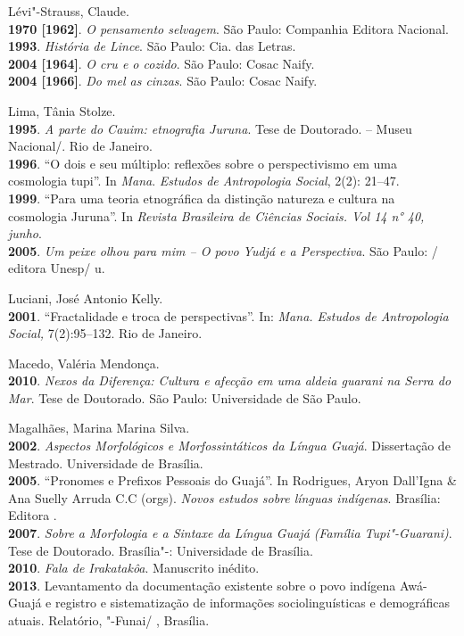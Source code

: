 \begin{Parskip}
Lévi"-Strauss, Claude.\\
\textbf{1970 {[}1962{]}}. \emph{O pensamento selvagem}. São Paulo:
Companhia Editora Nacional.\\
\textbf{1993}. \emph{História de Lince}. São Paulo: Cia. das Letras.\\
\textbf{2004 {[}1964{]}}. \emph{O cru e o cozido}. São Paulo: Cosac
Naify.\\
\textbf{2004 {[}1966{]}}. \emph{Do mel as cinzas}. São Paulo: Cosac
Naify.

Lima, Tânia Stolze.\\
\textbf{1995}. \emph{A parte do Cauim: etnografia Juruna}. Tese de
Doutorado.  -- Museu Nacional/. Rio de Janeiro.\\
\textbf{1996}. ``O dois e seu múltiplo: reflexões sobre o perspectivismo
em uma cosmologia tupi''. In \emph{Mana}. \emph{Estudos de Antropologia
Social}, 2(2): 21--47.\\
\textbf{1999}. ``Para uma teoria etnográfica da distinção natureza e
cultura na cosmologia Juruna''. In \emph{Revista Brasileira de Ciências
Sociais. Vol 14 n° 40, junho}.\\
\textbf{2005}. \emph{Um peixe olhou para mim -- O povo Yudjá e a
Perspectiva}. São Paulo: / editora Unesp/ u.

Luciani, José Antonio Kelly.\\
\textbf{2001}. ``Fractalidade e troca de perspectivas''. In: \emph{Mana.
Estudos de Antropologia Social,} 7(2):95--132. Rio de Janeiro.

Macedo, Valéria Mendonça.\\
\textbf{2010}. \emph{Nexos da Diferença: Cultura e afecção em uma aldeia
guarani na Serra do Mar}. Tese de Doutorado. São Paulo: Universidade de
São Paulo.

Magalhães, Marina Marina Silva.\\
\textbf{2002}. \emph{Aspectos Morfológicos e Morfossintáticos da Língua
Guajá}. Dissertação de Mestrado. Universidade de Brasília.\\
\textbf{2005}. ``Pronomes e Prefixos Pessoais do Guajá''. In Rodrigues,
Aryon Dall'Igna \& Ana Suelly Arruda C.C (orgs). \emph{Novos estudos
sobre línguas indígenas}. Brasília: Editora .\\
\textbf{2007}. \emph{Sobre a Morfologia e a Sintaxe da Língua Guajá
(Família Tupi"-Guarani)}. Tese de Doutorado. Brasília"-: Universidade de
Brasília.\\
\textbf{2010}. \emph{Fala de Irakatakôa}. Manuscrito inédito.\\
\textbf{2013}. Levantamento da documentação existente sobre o povo
indígena Awá-Guajá e registro e sistematização de informações
sociolinguísticas e demográficas atuais. Relatório, "-Funai/ ,
Brasília.


\end{Parskip}
